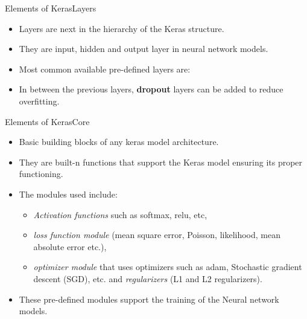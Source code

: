 \documentclass{beamer}
\begin{document}
\begin{frame}{Elements of Keras}{Layers}
\begin{itemize}
\item Layers are next in the hierarchy of the Keras structure. 
\item They are input, hidden and output layer in neural network models. 

\item Most common available pre-defined layers are: 
\item In between the previous layers, \textbf{dropout} layers can be added to reduce overfitting.

\end{itemize}
\end{frame}
\begin{frame}{Elements of Keras}{Core}
\begin{itemize}
\item  Basic building blocks of any keras model architecture. 
\item They are built-n functions that support the Keras model ensuring its proper functioning. 
\item The modules used include: 
\begin{itemize}
    \item \emph{Activation functions} such as softmax, relu, etc, 
    \item \emph{loss function module} (mean square error, Poisson, likelihood,  mean absolute error etc.), 
    \item \emph{optimizer module} that uses optimizers such as adam, Stochastic gradient descent (SGD), etc. and \emph{regularizers} (L1 and L2 regularizers). 
\end{itemize}
\item These pre-defined modules  support the training of the Neural network models.
\end{itemize}
\end{frame}
\end{document}
